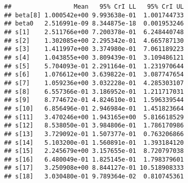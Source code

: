 \documentclass[]{article}
\newenvironment{Shaded}{\begin{snugshade}}{\end{snugshade}}
\newcommand{\CommentTok}[1]{\textcolor[rgb]{0.56,0.35,0.01}{\textit{#1}}}
\newcommand{\ControlFlowTok}[1]{\textcolor[rgb]{0.13,0.29,0.53}{\textbf{#1}}}
\newcommand{\DataTypeTok}[1]{\textcolor[rgb]{0.13,0.29,0.53}{#1}}
\newcommand{\DecValTok}[1]{\textcolor[rgb]{0.00,0.00,0.81}{#1}}
\newcommand{\FloatTok}[1]{\textcolor[rgb]{0.00,0.00,0.81}{#1}}
\newcommand{\KeywordTok}[1]{\textcolor[rgb]{0.13,0.29,0.53}{\textbf{#1}}}
\newcommand{\NormalTok}[1]{#1}
\newcommand{\OperatorTok}[1]{\textcolor[rgb]{0.81,0.36,0.00}{\textbf{#1}}}
\newcommand{\StringTok}[1]{\textcolor[rgb]{0.31,0.60,0.02}{#1}}
\begin{document}
\begin{Shaded}
\end{Shaded}

\begin{verbatim}
##                 Mean   95% CrI LL   95% CrI UL
## beta[8] 1.000542e+00 9.993638e-01  1.001744733
## beta0   2.516991e-09 8.344875e-18  0.001953246
## s[1]    2.511766e+00 7.200378e-01  6.248440748
## s[2]    1.302085e+00 2.295342e-01  4.665787130
## s[3]    1.411997e+00 3.374980e-01  7.061189223
## s[4]    1.043855e+00 3.809439e-01  3.109486121
## s[5]    5.704093e-01 2.291164e-01  1.231970644
## s[6]    1.076612e+00 3.639822e-01  3.087747654
## s[7]    1.059236e+00 3.032228e-01  4.285303107
## s[8]    6.557366e-01 3.186952e-01  1.211717031
## s[9]    8.774672e-01 4.824610e-01  1.596339544
## s[10]   6.856496e-01 2.946984e-01  1.451823664
## s[11]   3.470246e+00 1.943165e+00  5.816618529
## s[12]   8.538050e-01 3.984806e-01  1.786170986
## s[13]   3.729092e-01 1.507377e-01  0.763206866
## s[14]   5.103200e-01 1.560891e-01  1.393184120
## s[15]   2.245679e+00 3.157655e-01  8.720797038
## s[16]   6.480049e-01 1.825145e-01  1.798379601
## s[17]   3.250908e+00 8.844127e-01 10.518908333
## s[18]   3.030480e-01 9.789364e-02  0.810745361
\end{verbatim}
\end{document}
